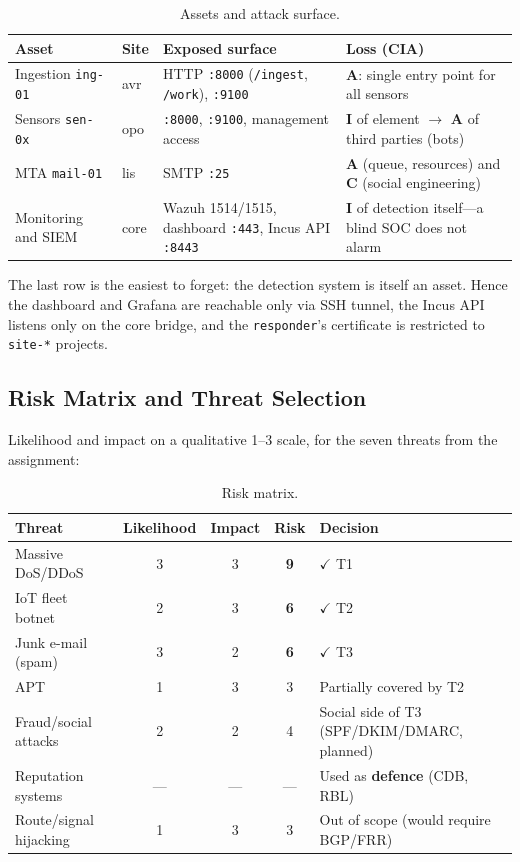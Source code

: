 \documentclass[11pt,a4paper]{article}
\begin{document}
\begin{table}[H]
  \centering
  \caption{Assets and attack surface.}
  \label{tab:assets}
  \begin{tabular}{@{}p{2.5cm}lp{4cm}p{4cm}@{}}
    \toprule
    \textbf{Asset} & \textbf{Site} & \textbf{Exposed surface} & \textbf{Loss (CIA)} \\
    \midrule
    Ingestion \texttt{ing-01} & avr & HTTP \texttt{:8000} (\texttt{/ingest}, \texttt{/work}),
      \texttt{:9100} &
      \textbf{A}: single entry point for all sensors \\
    Sensors \texttt{sen-0x} & opo & \texttt{:8000}, \texttt{:9100}, management access &
      \textbf{I} of element $\to$ \textbf{A} of third parties (bots) \\
    MTA \texttt{mail-01} & lis & SMTP \texttt{:25} &
      \textbf{A} (queue, resources) and \textbf{C} (social engineering) \\
    Monitoring and SIEM & core & Wazuh 1514/1515, dashboard \texttt{:443}, Incus API \texttt{:8443} &
      \textbf{I} of detection itself---a blind SOC does not alarm \\
    \bottomrule
  \end{tabular}
\end{table}

The last row is the easiest to forget: the detection system is itself an asset. Hence the
dashboard and Grafana are reachable only via SSH tunnel, the Incus API listens only on the
core bridge, and the \texttt{responder}'s certificate is restricted to \texttt{site-*}
projects.

\subsection{Risk Matrix and Threat Selection}

Likelihood and impact on a qualitative 1--3 scale, for the seven threats from the assignment:

\begin{table}[H]
  \centering
  \caption{Risk matrix.}
  \label{tab:risk}
  \begin{tabular}{@{}lcccp{4.5cm}@{}}
    \toprule
    \textbf{Threat} & \textbf{Likelihood} & \textbf{Impact} & \textbf{Risk} & \textbf{Decision} \\
    \midrule
    Massive DoS/DDoS & 3 & 3 & \textbf{9} & $\checkmark$ T1 \\
    IoT fleet botnet & 2 & 3 & \textbf{6} & $\checkmark$ T2 \\
    Junk e-mail (spam) & 3 & 2 & \textbf{6} & $\checkmark$ T3 \\
    APT & 1 & 3 & 3 & Partially covered by T2 \\
    Fraud/social attacks & 2 & 2 & 4 & Social side of T3 (SPF/DKIM/DMARC, planned) \\
    Reputation systems & --- & --- & --- & Used as \textbf{defence} (CDB, RBL) \\
    Route/signal hijacking & 1 & 3 & 3 & Out of scope (would require BGP/FRR) \\
    \bottomrule
  \end{tabular}
\end{table}
\end{document}
